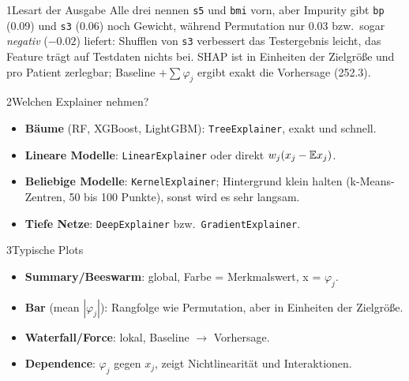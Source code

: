 
\begin{hngrid}
%
%
\begin{hnp}[raster multicolumn=6,acc=hnteal]{1}{Lesart der Ausgabe}
Alle drei nennen \texttt{s5} und \texttt{bmi} vorn, aber Impurity gibt \texttt{bp} (0.09) und \texttt{s3} (0.06) noch Gewicht, während Permutation nur $0.03$ bzw.\ sogar \emph{negativ} ($-0.02$) liefert: Shufflen von \texttt{s3} verbessert das Testergebnis leicht, das Feature trägt auf Testdaten nichts bei. SHAP ist in Einheiten der Zielgröße und pro Patient zerlegbar; Baseline $+\sum\varphi_j$ ergibt exakt die Vorhersage (252.3).
\end{hnp}
%
%
\begin{hnp}[raster multicolumn=3,acc=hnnavy]{2}{Welchen Explainer nehmen?}
\begin{itemize}
\item \textbf{Bäume} (RF, XGBoost, LightGBM): \texttt{TreeExplainer}, exakt und schnell.
\item \textbf{Lineare Modelle}: \texttt{LinearExplainer} oder direkt $w_j(x_j-\mathbb{E} x_j)$.
\item \textbf{Beliebige Modelle}: \texttt{KernelExplainer}; Hintergrund klein halten (k-Means-Zentren, 50 bis 100 Punkte), sonst wird es sehr langsam.
\item \textbf{Tiefe Netze}: \texttt{DeepExplainer} bzw.\ \texttt{GradientExplainer}.
\end{itemize}
\end{hnp}
%
\begin{hnp}[raster multicolumn=3,acc=hngreen]{3}{Typische Plots}
\begin{itemize}
\item \textbf{Summary/Beeswarm}: global, Farbe = Merkmalswert, x = $\varphi_j$.
\item \textbf{Bar} (mean $|\varphi_j|$): Rangfolge wie Permutation, aber in Einheiten der Zielgröße.
\item \textbf{Waterfall/Force}: lokal, Baseline $\to$ Vorhersage.
\item \textbf{Dependence}: $\varphi_j$ gegen $x_j$, zeigt Nichtlinearität und Interaktionen.
\end{itemize}
\end{hnp}
%
\end{hngrid}
